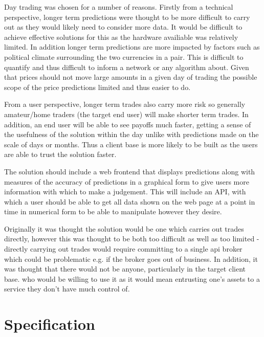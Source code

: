     Day trading was chosen for a number of reasons. Firstly from a technical perspective, longer term predictions were thought to be more difficult to carry out as they would likely need to consider more data. It would be difficult to achieve effective solutions for this as the hardware availiable was relatively limited. In addition longer term predictions are more impacted by factors such as political climate surrounding the two currencies in a pair. This is difficult to quantify and thus difficult to inform a network or any algorithm about. Given that prices should not move large amounts in a given day of trading the possible scope of the price predictions limited and thus easier to do. 
    
    From a user perspective, longer term trades also carry more risk so generally amateur/home traders (the target end user) will make shorter term trades. In addition, an end user will be able to see payoffs much faster, getting a sense of the usefulness of the solution within the day unlike with predictions made on the scale of days or months. Thus a client base is more likely to be built as the users are able to trust the solution faster.

    The solution should include a web frontend that displays predictions along with measures of the accuracy of predictions in a graphical form to give users more information with which to make a judgement. This will include an API, with which a user should be able to get all data shown on the web page at a point in time in numerical form to be able to manipulate however they desire.

    Originally it was thought the solution would be one which carries out trades directly, however this was thought to be both too difficult as well as too limited - directly carrying out trades would require committing to a single api broker which could be problematic e.g. if the broker goes out of business. In addition, it was thought that there would not be anyone, particularly in the target client base. who would be willing to use it as it would mean entrusting one's assets to a service they don't have much control of. 


    \section{Specification}
            
